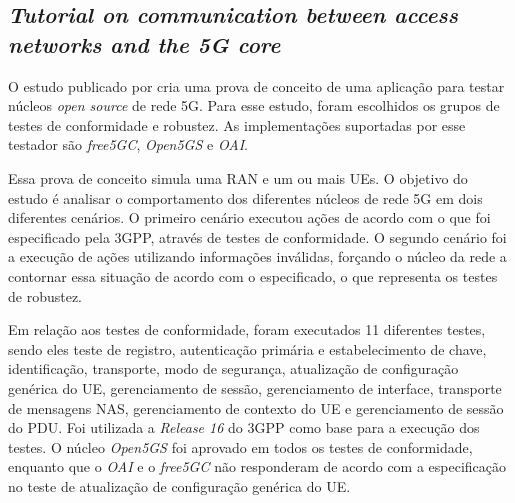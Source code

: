 \subsection{\textit{Tutorial on communication between access networks and the 5G core}}
\label{subsec:Dominato}

O estudo publicado por \cite{Dominato2021} cria uma prova de conceito de uma aplicação para testar núcleos \textit{open source} de rede 5G.
Para esse estudo, foram escolhidos os grupos de testes de conformidade e robustez.
As implementações suportadas por esse testador são \textit{free5GC}, \textit{Open5GS} e \textit{OAI}.

Essa prova de conceito simula uma RAN e um ou mais UEs.
O objetivo do estudo é analisar o comportamento dos diferentes núcleos de rede 5G em dois diferentes cenários. O primeiro cenário executou ações de acordo com o que foi especificado pela 3GPP, através de testes de conformidade. O segundo cenário foi a execução de ações utilizando informações inválidas, forçando o núcleo da rede a contornar essa situação de acordo com o especificado, o que representa os testes de robustez.

Em relação aos testes de conformidade, foram executados 11 diferentes testes, sendo eles teste de registro, autenticação primária e estabelecimento de chave, identificação, transporte, modo de segurança, atualização de configuração genérica do UE, gerenciamento de sessão, gerenciamento de interface, transporte de mensagens NAS, gerenciamento de contexto do UE e gerenciamento de sessão do PDU.
Foi utilizada a \textit{Release 16} do 3GPP como base para a execução dos testes.
O núcleo \textit{Open5GS} foi aprovado em todos os testes de conformidade, enquanto que o \textit{OAI} e o \textit{free5GC} não responderam de acordo com a especificação no teste de atualização de configuração genérica do UE.

